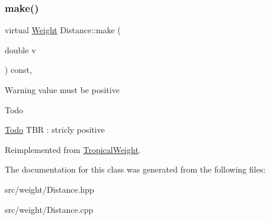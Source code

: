 \subsubsection{\texorpdfstring{make()}{make()}}
{\footnotesize\ttfamily virtual \mbox{\hyperlink{classWeight}{Weight}} Distance\+::make (\begin{DoxyParamCaption}\item[{double}]{v }\end{DoxyParamCaption}) const\hspace{0.3cm}{\ttfamily [inline]}, {\ttfamily [virtual]}}

\begin{DoxyWarning}{Warning}
value must be positive
\end{DoxyWarning}
\begin{DoxyRefDesc}{Todo}
\item[\mbox{\hyperlink{todo__todo000038}{Todo}}]T\+BR \+: stricly positive \end{DoxyRefDesc}


Reimplemented from \mbox{\hyperlink{classTropicalWeight_abc00c8fe56beedff6b7192325833d6d3}{Tropical\+Weight}}.



The documentation for this class was generated from the following files\+:\begin{DoxyCompactItemize}
\item 
src/weight/Distance.\+hpp\item 
src/weight/Distance.\+cpp\end{DoxyCompactItemize}
